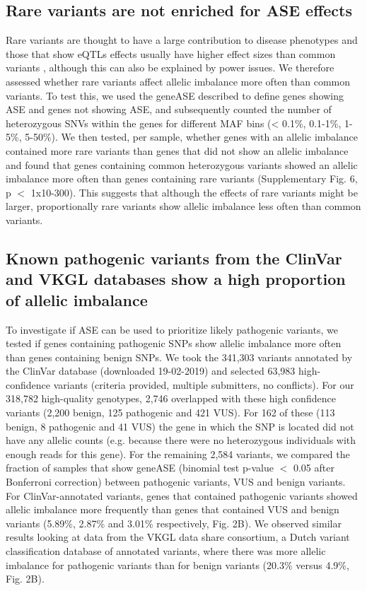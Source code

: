 \subsection{Rare variants are not enriched for ASE effects}
Rare variants are thought to have a large contribution to disease phenotypes and those that show eQTLs effects usually have higher effect sizes than common variants \cite{claringbouldGeneticArchitectureMolecular2017a}, although this can also be explained by power issues. We therefore assessed whether rare variants affect allelic imbalance more often than common variants. To test this, we used the geneASE described to define genes showing ASE and genes not showing ASE, and subsequently counted the number of heterozygous SNVs within the genes for different MAF bins (< 0.1\%, 0.1-1\%, 1-5\%, 5-50\%). We then tested, per sample, whether genes with an allelic imbalance contained more rare variants than genes that did not show an allelic imbalance and found that genes containing common heterozygous variants showed an allelic imbalance more often than genes containing rare variants (Supplementary Fig. 6, p $<$ 1x10-300). This suggests that although the effects of rare variants might be larger, proportionally rare variants show allelic imbalance less often than common variants. 

\subsection{Known pathogenic variants from the ClinVar and VKGL databases show a high proportion of allelic imbalance}
To investigate if ASE can be used to prioritize likely pathogenic variants, we tested if genes containing pathogenic SNPs show allelic imbalance more often than genes containing benign SNPs. We took the 341,303 variants annotated by the ClinVar database (downloaded 19-02-2019) and selected 63,983 high-confidence variants (criteria provided, multiple submitters, no conflicts). For our 318,782 high-quality genotypes, 2,746 overlapped with these high confidence variants (2,200 benign, 125 pathogenic and 421 VUS). For 162 of these (113 benign, 8 pathogenic and 41 VUS) the gene in which the SNP is located did not have any allelic counts (e.g. because there were no heterozygous individuals with enough reads for this gene). For the remaining 2,584 variants, we compared the fraction of samples that show geneASE (binomial test p-value $<$ 0.05 after Bonferroni correction) between pathogenic variants, VUS and benign variants. For ClinVar-annotated variants, genes that contained pathogenic variants showed allelic imbalance more frequently than genes that contained VUS and benign variants (5.89\%, 2.87\% and 3.01\% respectively, Fig. 2B)\cite{landrumClinVarImprovingAccess2018}. We observed similar results looking at data from the VKGL data share consortium\cite{fokkemaDutchGenomeDiagnostic2019}, a Dutch variant classification database of annotated variants, where there was more allelic imbalance for pathogenic variants than for benign variants (20.3\% versus 4.9\%, Fig. 2B). 

